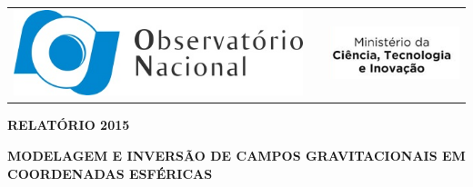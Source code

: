 \documentclass[12pt,a4paper]{article}
\begin{document}
\begin{tabular}{lcr}
    \includegraphics{img/logo-on.jpg}
    & \hspace{5cm} &
    \includegraphics{img/logo-mcti.png}
\end{tabular}

\vspace{0.5cm}

\begin{center}
    \textbf{\LARGE RELATÓRIO 2015}

    \vspace{1cm}

    \textbf{MODELAGEM E INVERSÃO DE CAMPOS GRAVITACIONAIS EM COORDENADAS
            ESFÉRICAS}
\end{center}

\vspace{1.5cm}
\end{document}
